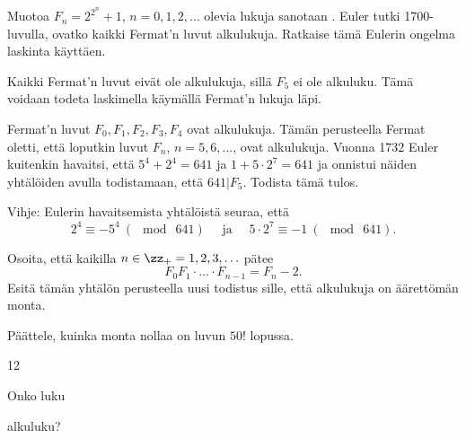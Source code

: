 \begin{tehtava}
    Muotoa $F_n = 2^{2^n}+1$, $n=0, 1, 2, \ldots$ olevia lukuja sanotaan . Euler tutki 1700-luvulla, ovatko kaikki Fermat'n luvut alkulukuja. Ratkaise tämä Eulerin ongelma laskinta käyttäen.
    
    \begin{vastaus}
        Kaikki Fermat'n luvut eivät ole alkulukuja, sillä $F_5$ ei ole alkuluku. Tämä voidaan todeta laskimella käymällä Fermat'n lukuja läpi.
    \end{vastaus}
\end{tehtava}

\begin{tehtava}
    Fermat'n luvut $F_0, F_1, F_2, F_3, F_4$ ovat alkulukuja. Tämän perusteella Fermat oletti, että loputkin luvut $F_n$, $n=5, 6, \ldots$, ovat alkulukuja. Vuonna 1732 Euler kuitenkin havaitsi, että $5^4 + 2^4 = 641$
ja $1 + 5\cdot 2^7 = 641$ ja onnistui näiden yhtälöiden avulla todistamaan, että $641 | F_5$. Todista tämä tulos.

Vihje: Eulerin havaitsemista yhtälöistä seuraa, että
\[
2^4 \equiv -5^4\ (\mod\ 641)\quad\text{ ja }\quad5\cdot 2^7 \equiv -1\ (\mod\ 641).
\]
\end{tehtava}

\begin{tehtava}
    Osoita, että kaikilla $n\in\zz_{+}=1, 2, 3, \ldots$ pätee
\[
F_{0}F_{1}\cdot \ldots \cdot F_{n-1} = F_{n} - 2.
\]
Esitä tämän yhtälön perusteella uusi todistus sille,
että alkulukuja on äärettömän monta.
\end{tehtava}

\begin{tehtava}
    Päättele, kuinka monta nollaa on luvun $50!$ lopussa.

    \begin{vastaus}
        12
    \end{vastaus}
    
\end{tehtava}


\begin{tehtava}
    Onko luku
    \begin{alakohdat}
    \end{alakohdat}
    alkuluku?
    
    \begin{vastaus}
        \begin{alakohdat}
        \end{alakohdat}
    \end{vastaus}
    
\end{tehtava}

